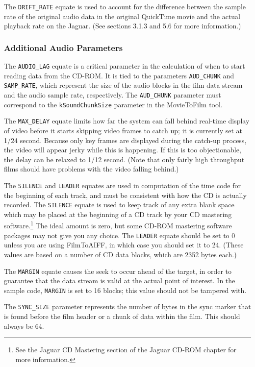 \documentclass[12pt,letterpaper,twoside]{article}
\begin{document}
The \texttt{DRIFT\_RATE} equate is used to account for the difference between the sample rate of the original audio data in the original QuickTime movie and the actual playback rate on the Jaguar. (See sections 3.1.3 and 5.6 for more information.)

\subsubsection{Additional Audio Parameters}
The \texttt{AUDIO\_LAG} equate is a critical parameter in the calculation of when to start reading data from the CD-ROM. It is tied to the parameters \texttt{AUD\_CHUNK} and \texttt{SAMP\_RATE}, which represent the size of the audio blocks in the film data stream and the audio sample rate, respectively. The \texttt{AUD\_CHUNK} parameter must correspond to the \texttt{kSoundChunkSize} parameter in the MovieToFilm tool.

The \texttt{MAX\_DELAY} equate limits how far the system can fall behind real-time display of video before it starts skipping video frames to catch up; it is currently set at 1/24 second. Because only key frames are displayed during the catch-up process, the video will appear jerky while this is happening. If this is too objectionable, the delay can be relaxed to 1/12 second. (Note that only fairly high throughput films should have problems with the video falling behind.)

The \texttt{SILENCE} and \texttt{LEADER} equates are used in computation of the time code for the beginning of each track, and must be consistent with how the CD is actually recorded. The \texttt{SILENCE} equate is used to keep track of any extra blank space which may be placed at the beginning of a CD track by your CD mastering software.\footnote{See the Jaguar CD Mastering section of the Jaguar CD-ROM chapter for more information.} The ideal amount is zero, but some CD-ROM mastering software packages may not give you any choice. The \texttt{LEADER} equate should be set to 0 unless you are using FilmToAIFF, in which case you should set it to 24. (These values are based on a number of CD data blocks, which are 2352 bytes each.)

The \texttt{MARGIN} equate causes the seek to occur ahead of the target, in order to guarantee that the data stream is valid at the actual point of interest. In the sample code, \texttt{MARGIN} is set to 16 blocks; this value should not be tampered with.

The \texttt{SYNC\_SIZE} parameter represents the number of bytes in the sync marker that is found before the film header or a chunk of data within the film. This should always be 64.
\end{document}
